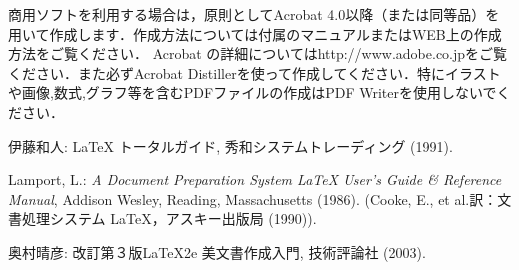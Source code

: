 \documentclass{jsarticle}
\begin{document}
\begin{enumerate}
商用ソフトを利用する場合は，原則としてAcrobat 4.0以降（または同等品）を用いて作成します．作成方法については付属のマニュアルまたはWEB上の作成方法をご覧ください．
Acrobat の詳細についてはhttp://www.adobe.co.jpをご覧ください．また必ずAcrobat Distillerを使って作成してください．特にイラストや画像,数式,グラフ等を含むPDFファイルの作成はPDF Writerを使用しないでください．

\end{enumerate}


\begin{thebibliography}{99}
伊藤和人: {\LaTeX} トータルガイド, 秀和システムトレーディング (1991).

Lamport, L.: {\em A Document Preparation System {\LaTeX} User's Guide \&
  Reference Manual\/}, Addison Wesley, Reading, Massachusetts (1986).
\newblock (Cooke, E., et al.訳：文書処理システム {\LaTeX}，アスキー出版局
  (1990)).

奥村晴彦: 改訂第３版{\LaTeX2e} 美文書作成入門, 技術評論社 (2003).

\end{thebibliography}
\end{document}
